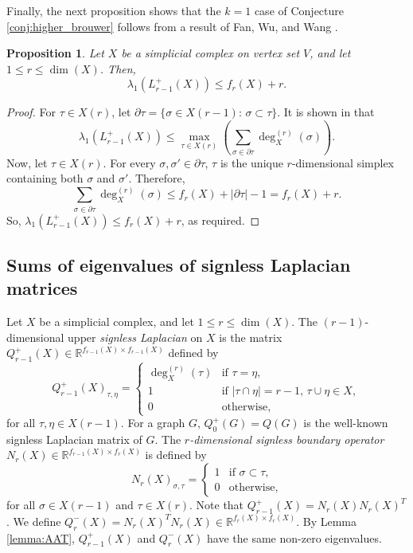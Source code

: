 \documentclass[a4paper,11pt]{article}
\theoremstyle{plain}
\newtheorem{proposition}[theorem]{\bf Proposition}
\theoremstyle{definition}
\numberwithin{theorem}{section}
\numberwithin{equation}{section}
\newcommand{\Rea}{{\mathbb R}}
\begin{document}
Finally, the next proposition shows that the $k=1$ case of Conjecture \ref{conj:higher_brouwer} follows from a result of Fan, Wu, and Wang \cite{fan2025largest}.

\begin{proposition}
   Let $X$ be a simplicial complex on vertex set $V$, and let $1\le r\le \dim(X)$. Then,
\[
    \lambda_1(L_{r-1}^{+}(X)) \le f_{r}(X) +r.
\] 
\end{proposition}
\begin{proof}
    For $\tau\in X(r)$, let $\partial\tau=\{\sigma\in X(r-1):\, \sigma\subset\tau\}$. 
    It is shown in \cite[Theorem 3.5]{fan2025largest} that
    \[
        \lambda_1(L_{r-1}^+(X))\le \max_{\tau\in X(r)} \left(\sum_{\sigma\in \partial \tau} \deg_X^{(r)}(\sigma)\right).
    \]
    Now, let $\tau\in X(r)$. For every $\sigma,\sigma'\in \partial\tau$, $\tau$ is the unique $r$-dimensional simplex containing both $\sigma$ and $\sigma'$. Therefore,
    \[
   \sum_{\sigma\in \partial \tau} \deg_X^{(r)}(\sigma)\le  f_r(X)+ |\partial \tau|-1 = f_r(X)+r.
    \]
    So, $ \lambda_1(L_{r-1}^+(X))\le f_r(X)+r$, as required.
\end{proof}

\subsection{Sums of eigenvalues of signless Laplacian matrices}

Let $X$ be a simplicial complex, and let $1\le r\le \dim(X)$. The $(r-1)$-dimensional upper \emph{signless Laplacian} on $X$ is the matrix $Q_{r-1}^{+}(X)\in \Rea^{f_{r-1}(X)\times f_{r-1}(X)}$ defined by
\[
    Q_{r-1}^{+}(X)_{\tau,\eta}= \begin{cases}
        \deg_X^{(r)}(\tau) & \text{if } \tau=\eta,\\
        1 & \text{if } |\tau\cap \eta|=r-1,\, \tau\cup\eta\in X,\\
        0 & \text{otherwise,}
    \end{cases}
\]
for all $\tau,\eta\in X(r-1)$. For a graph $G$,  $Q_0^{+}(G)=Q(G)$ is the well-known signless Laplacian matrix of $G$. 
The \emph{$r$-dimensional signless boundary operator} $N_r(X)\in \Rea^{f_{r-1}(X)\times f_r(X)}$ is defined by
\[
    N_r(X)_{\sigma,\tau} = \begin{cases}
        1 & \text{if } \sigma\subset\tau,\\
        0 & \text{otherwise,}
    \end{cases}
\]
for all $\sigma\in X(r-1)$ and $\tau\in X(r)$. Note that $Q^{+}_{r-1}(X)= N_r(X) N_r(X)^{T}$. We define $Q^{-}_r(X)= N_r(X)^T N_r(X)\in \Rea^{f_r(X)\times f_r(X)}$. By Lemma \ref{lemma:AAT}, $Q_{r-1}^{+}(X)$ and $Q_r^{-}(X)$ have the same non-zero eigenvalues.
\end{document}
